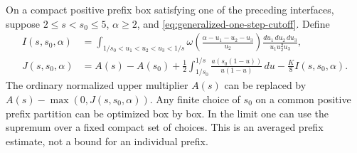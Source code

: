 \begin{proposition}
\label{prop:generalized-one-step-defect}
On a compact positive prefix box satisfying one of the preceding
interfaces, suppose $2\le s<s_0\le5$, $\alpha\ge2$, and
\eqref{eq:generalized-one-step-cutoff}. Define
\begin{align}
 I(s,s_0,\alpha)
 &=\int_{1/s_0<u_1<u_2<u_3<1/s}
 \omega\!\left(\frac{\alpha-u_1-u_2-u_3}{u_2}\right)
                  \frac{du_1\,du_2\,du_3}{u_1u_2^2u_3},\label{eq:generalized-one-step-I}\\
 J(s,s_0,\alpha)
 &=A(s)-A(s_0)+\frac12\int_{1/s_0}^{1/s}
       \frac{a(s_0(1-u))}{u(1-u)}\,du
                   -\frac K8 I(s,s_0,\alpha).
                   \label{eq:generalized-one-step-J}
\end{align}
The ordinary normalized upper multiplier $A(s)$ can be replaced by
$A(s)-\max(0,J(s,s_0,\alpha))$. Any finite choice of $s_0$ on a common
positive prefix partition can be optimized box by box. In the limit
one can use the supremum over a fixed compact set of choices. This is
an averaged prefix estimate, not a bound for an individual prefix.
\end{proposition}

